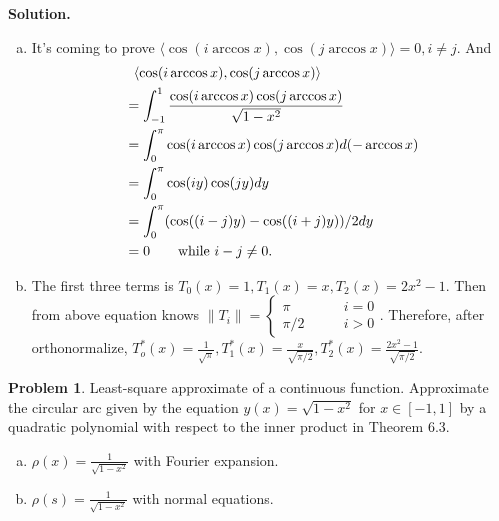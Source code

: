 \documentclass[a4paper]{book}
\newenvironment{solution}%
{\noindent\textbf{Solution.}}%
{\qedhere}
\numberwithin{equation}{chapter}
\theoremstyle{definition}
\newtheorem{pro}[exm]{Problem}
\begin{document}
\begin{solution}
  \begin{enumerate}[(a)]
  \item It's coming to prove $\langle \cos(i \arccos x), \cos (j \arccos x) \rangle = 0 , i \not = j$. And
    \begin{align*}
      &\ \ \langle \cos(i \arccos x), \cos (j \arccos x) \rangle\\
      &= \int_{-1}^1 \frac{\cos( i \arccos x)  \cos( j \arccos x)}{ \sqrt{1 - x^2}} \\
      &= \int_0^\pi \cos( i \arccos x)  \cos( j \arccos x) d(-\arccos x) \\
      & = \int_0^\pi \cos(iy) \cos(jy) dy\\
      & = \int_0^\pi ( \cos((i -j)y) - \cos((i +j)y))/2 dy \\
      &= 0 \qquad \textmd{while } i - j \not = 0. 
    \end{align*}

  \item The first three terms is $T_0(x) = 1, T_1(x) = x, T_2(x) = 2x^2 - 1$.
    Then from above equation knows $\lVert T_i \rVert =
    \begin{cases}
      \pi \qquad & i = 0 \\
      \pi/2 \qquad & i > 0
    \end{cases}
$. Therefore, after orthonormalize, $T_o^*(x) = \frac{1}{\sqrt{\pi}}, T_1^*(x) = \frac{x}{\sqrt{\pi/2}}, T_2^*(x) = \frac{2x^2 - 1}{\sqrt{\pi/2}}$.
  \end{enumerate}
\end{solution}

\begin{pro}
  Least-square approximate of a continuous function. Approximate the circular arc given by the equation $y(x) = \sqrt{1 - x^2}$ for $x \in [-1,1]$ by a quadratic polynomial with respect to the inner product in Theorem 6.3.
  \begin{enumerate}[(a)]
  \item $\rho(x) = \frac{1}{\sqrt{1 - x^2}}$ with Fourier expansion.

  \item $\rho(s) = \frac{1}{\sqrt{1 - x^2}}$ with normal equations.
    
  \end{enumerate}
\end{pro}
\end{document}
